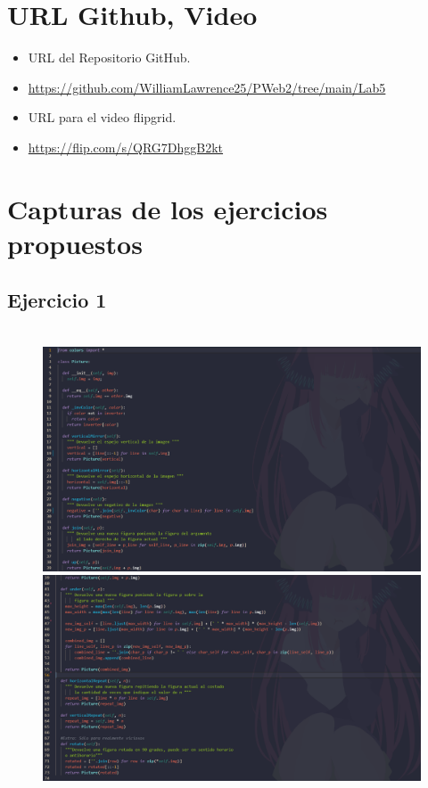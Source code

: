 \documentclass{article}
\begin{document}
	\section{URL Github, Video}
	\begin{itemize}
		\item URL del Repositorio GitHub.
		\item \url{https://github.com/WilliamLawrence25/PWeb2/tree/main/Lab5}
		\item URL para el video flipgrid.
		\item \url{https://flip.com/s/QRG7DhggB2kt}	
	
	\end{itemize}
	\clearpage	
	
	\section{Capturas de los ejercicios propuestos}
	
	\subsection{Ejercicio 1}
	\begin{figure}[H]
		\centering
		\
		\includegraphics[width=1.0\textwidth, keepaspectratio]{img/ejercicio1a}
		\includegraphics[width=1.0\textwidth, keepaspectratio]{img/ejercicio1b}
	\end{figure}
	
\end{document}
